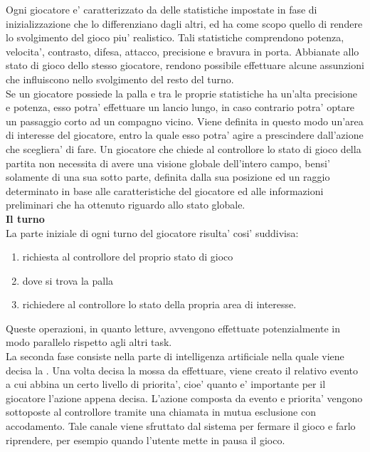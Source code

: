 Ogni giocatore e' caratterizzato da delle statistiche impostate in fase di inizializzazione che lo differenziano dagli altri, ed ha come scopo quello di rendere lo svolgimento del gioco piu' realistico. Tali statistiche comprendono potenza, velocita', contrasto, difesa, attacco, precisione e bravura in porta. Abbianate allo stato di gioco dello stesso giocatore, rendono possibile effettuare alcune assunzioni che influiscono nello svolgimento del resto del turno. \\

Se un giocatore possiede la palla e tra le proprie statistiche ha un'alta precisione e potenza, esso potra' effettuare un lancio lungo, in caso contrario potra' optare un passaggio corto ad un compagno vicino. Viene definita in questo modo un'area di interesse del giocatore, entro la quale esso potra' agire a prescindere dall'azione che scegliera' di fare. Un giocatore che chiede al controllore lo stato di gioco della partita non necessita di avere una visione globale dell'intero campo, bensi' solamente di una sua sotto parte, definita dalla sua posizione ed un raggio determinato in base alle caratteristiche del giocatore ed alle informazioni preliminari che ha ottenuto riguardo allo stato globale.\\

\textbf{Il turno}\\

La parte iniziale di ogni turno del giocatore risulta' cosi' suddivisa:

\begin{enumerate}
	\item richiesta al controllore del proprio stato di gioco
	\item dove si trova la palla
	\item richiedere al controllore lo stato della propria area di interesse.
\end{enumerate}

Queste operazioni, in quanto letture, avvengono effettuate potenzialmente in modo parallelo rispetto agli altri task.\\

La seconda fase consiste nella parte di intelligenza artificiale nella quale viene decisa la . Una volta decisa la mossa da effettuare, viene creato il relativo evento a cui abbina un certo livello di priorita', cioe' quanto e' importante per il giocatore l'azione appena decisa. L'azione composta da evento e priorita' vengono sottoposte al controllore tramite una chiamata in mutua esclusione con accodamento. Tale canale viene sfruttato dal sistema per fermare il gioco e farlo riprendere, per esempio quando l'utente mette in pausa il gioco.\\

